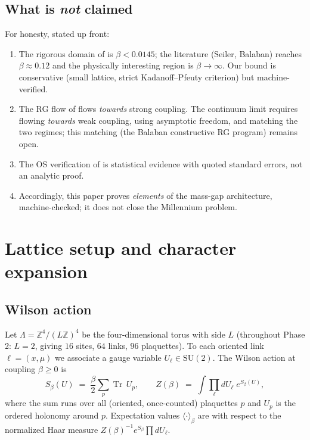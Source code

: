 \documentclass[11pt,a4paper]{article}
\newcommand{\SU}{\mathrm{SU}}
\newcommand{\Z}{\mathbb{Z}}
\newcommand{\Tr}{\operatorname{Tr}}
\begin{document}
\subsection{What is \emph{not} claimed}
\label{sec:notclaimed}

For honesty, stated up front:
\begin{enumerate}[leftmargin=1.5em]
  \item The rigorous domain of  is
    $\beta < 0.0145$; the literature (Seiler, Balaban) reaches
    $\beta \approx 0.12$ and the physically interesting region is
    $\beta \to \infty$.  Our bound is conservative (small lattice, strict
    Kadanoff--Pfeuty criterion) but machine-verified.
  \item The RG flow of  flows \emph{towards} strong
    coupling.  The continuum limit requires flowing \emph{towards} weak
    coupling, using asymptotic freedom, and matching the two regimes; this
    matching (the Balaban constructive RG program) remains open.
  \item The OS verification of  is statistical evidence
    with quoted standard errors, not an analytic proof.
  \item Accordingly, this paper proves \emph{elements} of the mass-gap
    architecture, machine-checked; it does not close the Millennium
    problem.
\end{enumerate}

\section{Lattice setup and character expansion}
\label{sec:setup}

\subsection{Wilson action}
\label{sec:action}

Let $\Lambda = \Z^4 / (L\Z)^4$ be the four-dimensional torus with side $L$
(throughout Phase 2: $L = 2$, giving $16$ sites, $64$ links, $96$
plaquettes).  To each oriented link $\ell = (x,\mu)$ we associate a gauge
variable $U_\ell \in \SU(2)$.  The Wilson action at coupling $\beta \ge 0$ is
\begin{equation}
  S_\beta(U) \;=\; \frac{\beta}{2} \sum_{p} \Tr\, U_p ,
  \qquad
  Z(\beta) \;=\; \int \prod_\ell dU_\ell \; e^{S_\beta(U)},
  \label{eq:wilson}
\end{equation}
where the sum runs over all (oriented, once-counted) plaquettes $p$ and
$U_p$ is the ordered holonomy around $p$.  Expectation values
$\langle \cdot \rangle_\beta$ are with respect to the normalized Haar
measure $Z(\beta)^{-1} e^{S_\beta} \prod dU_\ell$.
\end{document}
